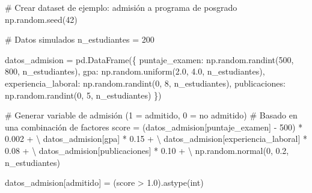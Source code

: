 \documentclass[
  doc,
  floatsintext,
  longtable,
  a4paper,
  nolmodern,
  notxfonts,
  notimes,
  12pt,
  colorlinks=true,linkcolor=blue,citecolor=blue,urlcolor=blue]{apa7}
\newenvironment{Shaded}{\begin{snugshade}}{\end{snugshade}}
\newcommand{\BuiltInTok}[1]{\textcolor[rgb]{0.00,0.23,0.31}{#1}}
\newcommand{\CommentTok}[1]{\textcolor[rgb]{0.37,0.37,0.37}{#1}}
\newcommand{\DecValTok}[1]{\textcolor[rgb]{0.68,0.00,0.00}{#1}}
\newcommand{\FloatTok}[1]{\textcolor[rgb]{0.68,0.00,0.00}{#1}}
\newcommand{\NormalTok}[1]{\textcolor[rgb]{0.00,0.23,0.31}{#1}}
\newcommand{\OperatorTok}[1]{\textcolor[rgb]{0.37,0.37,0.37}{#1}}
\newcommand{\StringTok}[1]{\textcolor[rgb]{0.13,0.47,0.30}{#1}}
\begin{document}
\begin{Shaded}
\begin{Highlighting}[]
\CommentTok{\# Crear dataset de ejemplo: admisión a programa de posgrado}
\NormalTok{np.random.seed(}\DecValTok{42}\NormalTok{)}

\CommentTok{\# Datos simulados}
\NormalTok{n\_estudiantes }\OperatorTok{=} \DecValTok{200}

\NormalTok{datos\_admision }\OperatorTok{=}\NormalTok{ pd.DataFrame(\{}
    \StringTok{\textquotesingle{}puntaje\_examen\textquotesingle{}}\NormalTok{: np.random.randint(}\DecValTok{500}\NormalTok{, }\DecValTok{800}\NormalTok{, n\_estudiantes),}
    \StringTok{\textquotesingle{}gpa\textquotesingle{}}\NormalTok{: np.random.uniform(}\FloatTok{2.0}\NormalTok{, }\FloatTok{4.0}\NormalTok{, n\_estudiantes),}
    \StringTok{\textquotesingle{}experiencia\_laboral\textquotesingle{}}\NormalTok{: np.random.randint(}\DecValTok{0}\NormalTok{, }\DecValTok{8}\NormalTok{, n\_estudiantes),}
    \StringTok{\textquotesingle{}publicaciones\textquotesingle{}}\NormalTok{: np.random.randint(}\DecValTok{0}\NormalTok{, }\DecValTok{5}\NormalTok{, n\_estudiantes)}
\NormalTok{\})}

\CommentTok{\# Generar variable de admisión (1 = admitido, 0 = no admitido)}
\CommentTok{\# Basado en una combinación de factores}
\NormalTok{score }\OperatorTok{=}\NormalTok{ (datos\_admision[}\StringTok{\textquotesingle{}puntaje\_examen\textquotesingle{}}\NormalTok{] }\OperatorTok{{-}} \DecValTok{500}\NormalTok{) }\OperatorTok{*} \FloatTok{0.002} \OperatorTok{+} \OperatorTok{\textbackslash{}}
\NormalTok{        datos\_admision[}\StringTok{\textquotesingle{}gpa\textquotesingle{}}\NormalTok{] }\OperatorTok{*} \FloatTok{0.15} \OperatorTok{+} \OperatorTok{\textbackslash{}}
\NormalTok{        datos\_admision[}\StringTok{\textquotesingle{}experiencia\_laboral\textquotesingle{}}\NormalTok{] }\OperatorTok{*} \FloatTok{0.08} \OperatorTok{+} \OperatorTok{\textbackslash{}}
\NormalTok{        datos\_admision[}\StringTok{\textquotesingle{}publicaciones\textquotesingle{}}\NormalTok{] }\OperatorTok{*} \FloatTok{0.10} \OperatorTok{+} \OperatorTok{\textbackslash{}}
\NormalTok{        np.random.normal(}\DecValTok{0}\NormalTok{, }\FloatTok{0.2}\NormalTok{, n\_estudiantes)}

\NormalTok{datos\_admision[}\StringTok{\textquotesingle{}admitido\textquotesingle{}}\NormalTok{] }\OperatorTok{=}\NormalTok{ (score }\OperatorTok{\textgreater{}} \FloatTok{1.0}\NormalTok{).astype(}\BuiltInTok{int}\NormalTok{)}


\end{Highlighting}
\end{Shaded}
\end{document}
